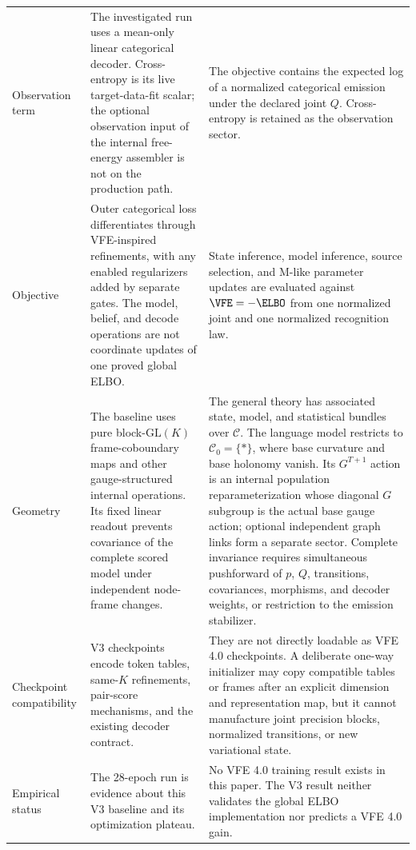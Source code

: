 \begin{longtable}{>{\raggedright\arraybackslash}p{} >{\raggedright\arraybackslash}p{} >{\raggedright\arraybackslash}p{}}
\addlinespace
Observation term
& The investigated run uses a mean-only linear categorical decoder. Cross-entropy is its live target-data-fit scalar; the optional observation input of the internal free-energy assembler is not on the production path.
& The objective contains the expected log of a normalized categorical emission under the declared joint $Q$. Cross-entropy is retained as the observation sector. \\
\addlinespace
Objective
& Outer categorical loss differentiates through VFE-inspired refinements, with any enabled regularizers added by separate gates. The model, belief, and decode operations are not coordinate updates of one proved global ELBO.
& State inference, model inference, source selection, and M-like parameter updates are evaluated against $\VFE=-\ELBO$ from one normalized joint and one normalized recognition law. \\
\addlinespace
Geometry
& The baseline uses pure block-$\mathrm{GL}(K)$ frame-coboundary maps and other gauge-structured internal operations. Its fixed linear readout prevents covariance of the complete scored model under independent node-frame changes.
& The general theory has associated state, model, and statistical bundles over $\mathcal C$. The language model restricts to $\mathcal C_0=\{\ast\}$, where base curvature and base holonomy vanish. Its $G^{T+1}$ action is an internal population reparameterization whose diagonal $G$ subgroup is the actual base gauge action; optional independent graph links form a separate sector. Complete invariance requires simultaneous pushforward of $p$, $Q$, transitions, covariances, morphisms, and decoder weights, or restriction to the emission stabilizer. \\
\addlinespace
Checkpoint compatibility
& V3 checkpoints encode token tables, same-$K$ refinements, pair-score mechanisms, and the existing decoder contract.
& They are not directly loadable as VFE 4.0 checkpoints. A deliberate one-way initializer may copy compatible tables or frames after an explicit dimension and representation map, but it cannot manufacture joint precision blocks, normalized transitions, or new variational state. \\
\addlinespace
Empirical status
& The 28-epoch run is evidence about this V3 baseline and its optimization plateau.
& No VFE 4.0 training result exists in this paper. The V3 result neither validates the global ELBO implementation nor predicts a VFE 4.0 gain. \\
\end{longtable}

